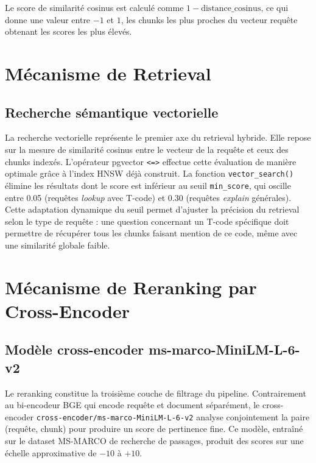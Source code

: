 Le score de similarité cosinus est calculé comme $1 - \text{distance\_cosinus}$, ce qui donne une valeur entre $-1$ et $1$, les chunks les plus proches du vecteur requête obtenant les scores les plus élevés.


\section{Mécanisme de Retrieval}

\subsection{Recherche sémantique vectorielle}
La recherche vectorielle représente le premier axe du retrieval hybride. Elle repose sur la mesure de similarité cosinus entre le vecteur de la requête et ceux des chunks indexés. L'opérateur pgvector \texttt{<=>} effectue cette évaluation de manière optimale grâce à l'index HNSW déjà construit. La fonction \texttt{vector\_search()} élimine les résultats dont le score est inférieur au seuil \texttt{min\_score}, qui oscille entre 0.05 (requêtes \textit{lookup} avec T-code) et 0.30 (requêtes \textit{explain} générales). Cette adaptation dynamique du seuil permet d'ajuster la précision du retrieval selon le type de requête : une question concernant un T-code spécifique doit permettre de récupérer tous les chunks faisant mention de ce code, même avec une similarité globale faible.
\section{Mécanisme de Reranking par Cross-Encoder}

\subsection{Modèle cross-encoder ms-marco-MiniLM-L-6-v2}

Le reranking constitue la troisième couche de filtrage du pipeline. Contrairement au bi-encodeur BGE qui encode requête et document séparément, le cross-encoder \texttt{cross-encoder/ms-marco-MiniLM-L-6-v2} analyse conjointement la paire (requête, chunk) pour produire un score de pertinence fine. Ce modèle, entraîné sur le dataset MS-MARCO de recherche de passages, produit des scores sur une échelle approximative de $-10$ à $+10$.


